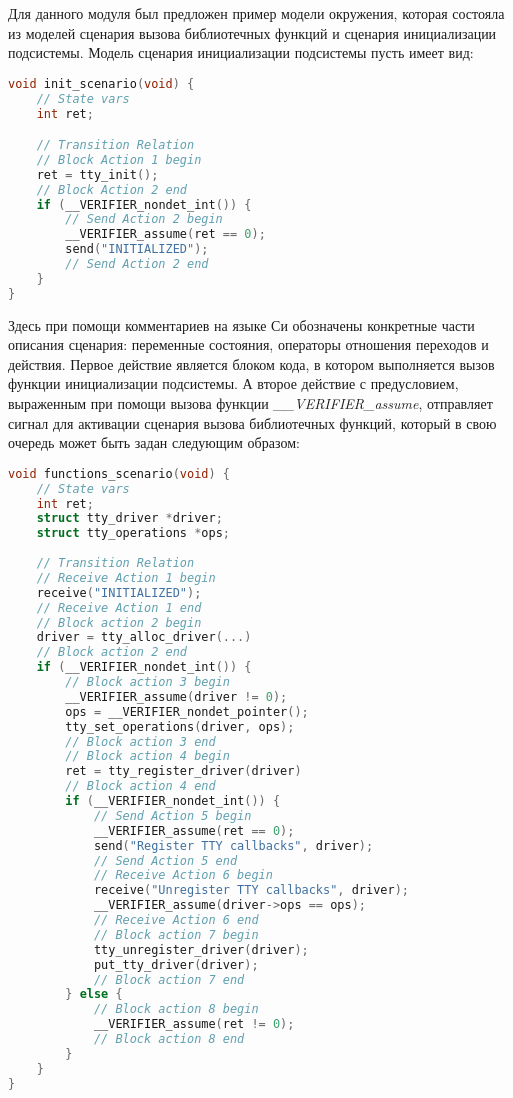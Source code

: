 Для данного модуля был предложен пример модели окружения, которая состояла из моделей сценария вызова библиотечных функций и сценария инициализации подсистемы.
Модель сценария инициализации подсистемы пусть имеет вид:

\begin{lstlisting}[language=C,basicstyle=\small]
void init_scenario(void) {
    // State vars
    int ret;

    // Transition Relation    
    // Block Action 1 begin
    ret = tty_init();
    // Block Action 2 end
    if (__VERIFIER_nondet_int()) {
        // Send Action 2 begin
        __VERIFIER_assume(ret == 0);
        send("INITIALIZED");
        // Send Action 2 end
    }
}
\end{lstlisting}

Здесь при помощи комментариев на языке Си обозначены конкретные части описания сценария: переменные состояния, операторы отношения переходов и действия.
Первое действие является блоком кода, в котором выполняется вызов функции инициализации подсистемы.
А второе действие с предусловием, выраженным при помощи вызова функции \textit{\_\_VERIFIER\_assume}, отправляет сигнал для активации сценария вызова библиотечных функций, который в свою очередь может быть задан следующим образом:

\begin{lstlisting}[language=C,basicstyle=\small]
void functions_scenario(void) {
    // State vars
    int ret;
    struct tty_driver *driver;
    struct tty_operations *ops;
    
    // Transition Relation
    // Receive Action 1 begin
    receive("INITIALIZED");
    // Receive Action 1 end
    // Block action 2 begin
    driver = tty_alloc_driver(...)
    // Block action 2 end
    if (__VERIFIER_nondet_int()) {
        // Block action 3 begin
        __VERIFIER_assume(driver != 0);
        ops = __VERIFIER_nondet_pointer();
        tty_set_operations(driver, ops);
        // Block action 3 end
        // Block action 4 begin
        ret = tty_register_driver(driver)
        // Block action 4 end
        if (__VERIFIER_nondet_int()) {
            // Send Action 5 begin
            __VERIFIER_assume(ret == 0);
            send("Register TTY callbacks", driver);
            // Send Action 5 end
            // Receive Action 6 begin
            receive("Unregister TTY callbacks", driver);
            __VERIFIER_assume(driver->ops == ops);
            // Receive Action 6 end
            // Block action 7 begin
            tty_unregister_driver(driver);    
            put_tty_driver(driver);
            // Block action 7 end
        } else {
            // Block action 8 begin
            __VERIFIER_assume(ret != 0);
            // Block action 8 end
        }
    }    
}
\end{lstlisting}


